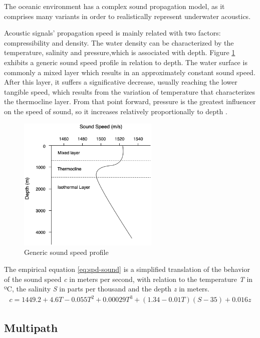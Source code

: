 The oceanic environment has a complex sound propagation model, as it comprises many variants in order to realistically represent underwater acoustics.

Acoustic signals' propagation speed is mainly related with two factors: compressibility and density. The water density can be characterized by the temperature, salinity and pressure,which is associated with depth. Figure \ref{fig:spd-sound} exhibits a generic sound speed profile in relation to depth. The water surface is commonly a mixed layer which results in an approximately constant sound speed. After this layer, it suffers a significative decrease, usually reaching the lower tangible speed, which results from the variation of temperature that characterizes the thermocline layer. From that point forward, pressure is the greatest influencer on the speed of sound, so it increases relatively proportionally to depth .

\begin{figure}[!htbp]
	\centering
	\includegraphics[width=0.6\textwidth]{figures/sound-profile}
	\caption{Generic sound speed profile}
	\label{fig:spd-sound}
\end{figure}

The empirical equation \ref{eq:spd-sound} \cite{ocean-acoust} is a simplified translation of the behavior of the sound speed \textit{c} in meters per second, with relation to the temperature \textit{T} in ºC, the salinity \textit{S} in parts per thousand and the depth \textit{z} in meters. 
\begin{eqnarray}
c = 1449.2 + 4.6T - 0.055T^2 + 0.00029T^3 + (1.34 - 0.01T)(S-35) + 0.016z 
\label{eq:spd-sound}
\end{eqnarray}


\subsection{Multipath} \label{subsec:multipath}

